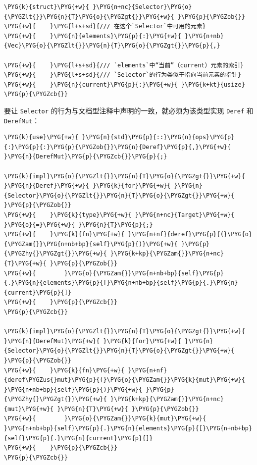 \begin{Verbatim}[commandchars=\\\{\},breaklines=true,breakanywhere=true,fontsize=\codefont,xleftmargin=17bp]
\PYG{k}{struct}\PYG{+w}{ }\PYG{n+nc}{Selector}\PYG{o}{\PYGZlt{}}\PYG{n}{T}\PYG{o}{\PYGZgt{}}\PYG{+w}{ }\PYG{p}{\PYGZob{}}
\PYG{+w}{    }\PYG{l+s+sd}{/// 在这个`Selector`中可用的元素}
\PYG{+w}{    }\PYG{n}{elements}\PYG{p}{:}\PYG{+w}{ }\PYG{n+nb}{Vec}\PYG{o}{\PYGZlt{}}\PYG{n}{T}\PYG{o}{\PYGZgt{}}\PYG{p}{,}

\PYG{+w}{    }\PYG{l+s+sd}{/// `elements`中“当前”（current）元素的索引}
\PYG{+w}{    }\PYG{l+s+sd}{/// `Selector`的行为类似于指向当前元素的指针}
\PYG{+w}{    }\PYG{n}{current}\PYG{p}{:}\PYG{+w}{ }\PYG{k+kt}{usize}
\PYG{p}{\PYGZcb{}}
\end{Verbatim}

要让 \texttt{Selector} 的行为与文档型注释中声明的一致，就必须为该类型实现 \texttt{Deref} 和 \texttt{DerefMut}：

\begin{Verbatim}[commandchars=\\\{\},breaklines=true,breakanywhere=true,fontsize=\codefont,xleftmargin=17bp]
\PYG{k}{use}\PYG{+w}{ }\PYG{n}{std}\PYG{p}{::}\PYG{n}{ops}\PYG{p}{:}\PYG{p}{:}\PYG{p}{\PYGZob{}}\PYG{n}{Deref}\PYG{p}{,}\PYG{+w}{ }\PYG{n}{DerefMut}\PYG{p}{\PYGZcb{}}\PYG{p}{;}

\PYG{k}{impl}\PYG{o}{\PYGZlt{}}\PYG{n}{T}\PYG{o}{\PYGZgt{}}\PYG{+w}{ }\PYG{n}{Deref}\PYG{+w}{ }\PYG{k}{for}\PYG{+w}{ }\PYG{n}{Selector}\PYG{o}{\PYGZlt{}}\PYG{n}{T}\PYG{o}{\PYGZgt{}}\PYG{+w}{ }\PYG{p}{\PYGZob{}}
\PYG{+w}{    }\PYG{k}{type}\PYG{+w}{ }\PYG{n+nc}{Target}\PYG{+w}{ }\PYG{o}{=}\PYG{+w}{ }\PYG{n}{T}\PYG{p}{;}
\PYG{+w}{    }\PYG{k}{fn}\PYG{+w}{ }\PYG{n+nf}{deref}\PYG{p}{(}\PYG{o}{\PYGZam{}}\PYG{n+nb+bp}{self}\PYG{p}{)}\PYG{+w}{ }\PYG{p}{\PYGZhy{}\PYGZgt{}}\PYG{+w}{ }\PYG{k+kp}{\PYGZam{}}\PYG{n+nc}{T}\PYG{+w}{ }\PYG{p}{\PYGZob{}}
\PYG{+w}{        }\PYG{o}{\PYGZam{}}\PYG{n+nb+bp}{self}\PYG{p}{.}\PYG{n}{elements}\PYG{p}{[}\PYG{n+nb+bp}{self}\PYG{p}{.}\PYG{n}{current}\PYG{p}{]}
\PYG{+w}{    }\PYG{p}{\PYGZcb{}}
\PYG{p}{\PYGZcb{}}

\PYG{k}{impl}\PYG{o}{\PYGZlt{}}\PYG{n}{T}\PYG{o}{\PYGZgt{}}\PYG{+w}{ }\PYG{n}{DerefMut}\PYG{+w}{ }\PYG{k}{for}\PYG{+w}{ }\PYG{n}{Selector}\PYG{o}{\PYGZlt{}}\PYG{n}{T}\PYG{o}{\PYGZgt{}}\PYG{+w}{ }\PYG{p}{\PYGZob{}}
\PYG{+w}{    }\PYG{k}{fn}\PYG{+w}{ }\PYG{n+nf}{deref\PYGZus{}mut}\PYG{p}{(}\PYG{o}{\PYGZam{}}\PYG{k}{mut}\PYG{+w}{ }\PYG{n+nb+bp}{self}\PYG{p}{)}\PYG{+w}{ }\PYG{p}{\PYGZhy{}\PYGZgt{}}\PYG{+w}{ }\PYG{k+kp}{\PYGZam{}}\PYG{n+nc}{mut}\PYG{+w}{ }\PYG{n}{T}\PYG{+w}{ }\PYG{p}{\PYGZob{}}
\PYG{+w}{        }\PYG{o}{\PYGZam{}}\PYG{k}{mut}\PYG{+w}{ }\PYG{n+nb+bp}{self}\PYG{p}{.}\PYG{n}{elements}\PYG{p}{[}\PYG{n+nb+bp}{self}\PYG{p}{.}\PYG{n}{current}\PYG{p}{]}
\PYG{+w}{    }\PYG{p}{\PYGZcb{}}
\PYG{p}{\PYGZcb{}}
\end{Verbatim}

